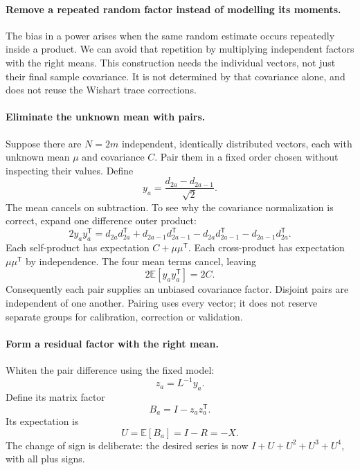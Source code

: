 \documentclass[11pt]{article}
\newcommand{\E}{\mathbb{E}}
\begin{document}
\paragraph{Remove a repeated random factor instead of modelling its moments.}
The bias in a power arises when the same random estimate occurs repeatedly
inside a product. We can avoid that repetition by multiplying independent
factors with the right means. This construction needs the individual vectors,
not just their final sample covariance. It is not determined by that covariance
alone, and does not reuse the Wishart trace corrections.

\paragraph{Eliminate the unknown mean with pairs.}
Suppose there are $N=2m$ independent, identically distributed vectors, each
with unknown mean $\mu$ and covariance $C$. Pair them in a fixed order chosen
without inspecting their values. Define
\begin{equation}
 y_a=\frac{d_{2a}-d_{2a-1}}{\sqrt2}.
\end{equation}
The mean cancels on subtraction. To see why the covariance normalization is
correct, expand one difference outer product:
\begin{equation}
 2y_a y_a^{\mathsf T}
 =d_{2a}d_{2a}^{\mathsf T}+d_{2a-1}d_{2a-1}^{\mathsf T}
 -d_{2a}d_{2a-1}^{\mathsf T}-d_{2a-1}d_{2a}^{\mathsf T}.
\end{equation}
Each self-product has expectation $C+\mu\mu^{\mathsf T}$. Each cross-product
has expectation $\mu\mu^{\mathsf T}$ by independence. The four mean terms
cancel, leaving
\begin{equation}
 2\E[y_a y_a^{\mathsf T}]=2C.
\end{equation}
Consequently each pair supplies an unbiased covariance factor. Disjoint pairs
are independent of one another. Pairing uses every vector; it does not reserve
separate groups for calibration, correction or validation.

\paragraph{Form a residual factor with the right mean.}
Whiten the pair difference using the fixed model:
\begin{equation}
 z_a=L^{-1}y_a.
\end{equation}
Define its matrix factor
\begin{equation}
 B_a=I-z_a z_a^{\mathsf T}.
\end{equation}
Its expectation is
\begin{equation}
 U=\E[B_a]=I-R=-X.
\end{equation}
The change of sign is deliberate: the desired series is now
$I+U+U^2+U^3+U^4$, with all plus signs.
\end{document}
